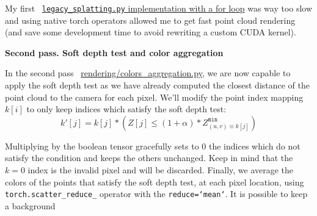 My first ~\href{https://github.com/balthazarneveu/per-pixel-point-rendering/blob/main/src/pixr/rendering/legacy\_splatting.py}{\texttt{legacy\_splatting.py} implementation with a for loop} was way too slow and using native torch operators allowed me to get fast point cloud rendering (and save some development time to avoid rewriting a custom CUDA kernel).

\noindent \textbf{Second pass. Soft depth test and color aggregation}

In the second pass  ~\href{https://github.com/balthazarneveu/per-pixel-point-rendering/blob/main/src/pixr/rendering/colors\_aggregation.py}{rendering/colors\_aggregation.py}, we are now capable to apply the soft depth test as we have already computed the closest distance of the point cloud to the camera for each pixel. We'll modify the point index mapping $k[i]$ to only keep indices which satisfy the soft depth test: 
$$ k'[j] = k[j] * \left(Z[j] \leq (1+\alpha) *Z^{\texttt{min}}_{(u,v) \equiv k[j]}\right)$$

\noindent Multiplying by the boolean tensor gracefully sets to 0 the indices which do not satisfy the condition and keeps the others unchanged. Keep in mind that the $k=0$ index is the invalid pixel and will be discarded.
Finally, we average the colors of the points that satisfy the soft depth test, at each pixel location, using \texttt{torch.scatter\_reduce\_} operator with the \texttt{reduce=`mean`}. It is possible to keep a background

